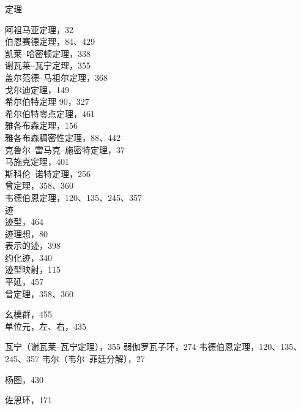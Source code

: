 
定理

阿祖马亚定理，32\\
伯恩赛德定理，84、429\\
凯莱–哈密顿定理，338\\
谢瓦莱–瓦宁定理，355\\
盖尔范德–马祖尔定理，368\\
戈尔迪定理，149\\
希尔伯特定理 90，327\\
希尔伯特零点定理，461\\
雅各布森定理，156\\
雅各布森稠密性定理，88、442\\
克鲁尔–雷马克–施密特定理，37\\
马施克定理，401\\
斯科伦–诺特定理，256\\
曾定理，358、360\\
韦德伯恩定理，120、135、245、357\\
迹\\
迹型，464\\
迹理想，80\\
表示的迹，398\\
约化迹，340\\
迹型映射，115\\
平延，457\\
曾定理，358、360


幺模群，455\\
单位元，左、右，435


瓦宁（谢瓦莱–瓦宁定理），355 弱伽罗瓦子环，274 韦德伯恩定理，120、135、245、357 韦尔（韦尔–菲廷分解），27


杨图，430


佐恩环，171
